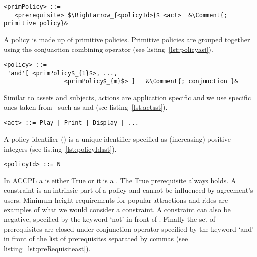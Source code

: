 
\lstset{mathescape, language=AST, escapechar=\&}  
\begin{minipage}[c]{0.95\textwidth}
\begin{lstlisting}[frame=single, caption={primPolicy},label={lst:primPolicyast}]
<primPolicy> ::=  
   <prerequisite> $\Rightarrow_{<policyId>}$ <act> 	&\Comment{; primitive policy}&
\end{lstlisting}
\end{minipage}

A policy is made up of primitive policies. Primitive policies are grouped together using the conjunction combining operator (see listing~\ref{lst:policyast}).

\lstset{mathescape, language=AST, escapechar=\&}  
\begin{minipage}[c]{0.95\textwidth}
\begin{lstlisting}[frame=single, caption={policy},label={lst:policyast}]
<policy> ::=  
 'and'[ <primPolicy$_{1}$>, ..., 
                 <primPolicy$_{m}$> ]	&\Comment{; conjunction }&
\end{lstlisting}
\end{minipage}

Similar to assets and subjects, actions are application specific and we use specific ones taken from~\cite{pucella2006} such as  and  (see listing~\ref{lst:actast}).

\lstset{mathescape, language=AST}  
\begin{lstlisting}[frame=single, caption={act},label={lst:actast}]
<act> ::= Play | Print | Display | ...
\end{lstlisting}

A policy identifier () is a unique identifier specified as (increasing) positive integers (see listing~\ref{lst:policyIdast}).

\lstset{mathescape, language=AST}  
\begin{lstlisting}[frame=single, caption={policyId},label={lst:policyIdast}]
<policyId> ::= N
\end{lstlisting}

In \ac{ACCPL} a  is either True or it is a . The True prerequisite always holds. A constraint is an intrinsic part of a policy and cannot be influenced by agreement's users. Minimum height requirements for popular attractions and rides are examples of what we would consider a constraint. A constraint can also be negative, specified by the keyword `not' in front of . Finally the set of prerequisites are closed under conjunction operator specified by the keyword `and' in front of the list of prerequisites separated by commas (see listing~\ref{lst:preRequisiteast}).

